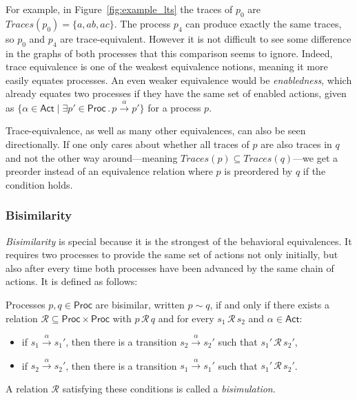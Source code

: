 For example, in Figure~\ref{fig:example_lts} the traces of $p_0$ are
$Traces(p_0) = \{a, ab, ac\}$.
The process $p_4$ can produce exactly the same traces,
so $p_0$ and $p_4$ are trace-equivalent.
However it is not difficult to see some difference in the graphs of both
processes that this comparison seems to ignore.
Indeed, trace equivalence is one of the weakest equivalence notions,
meaning it more easily equates processes.
An even weaker equivalence would be \emph{enabledness},
which already equates two processes
if they have the same set of enabled actions,
given as
$\{\alpha \in \mathsf{Act} \mid
   \exists p' \in \mathsf{Proc}\,.\,p \xrightarrow{\alpha} p'\}$
for a process $p$.

Trace-equivalence, as well as many other equivalences,
can also be seen directionally.
If one only cares about whether all traces of $p$ are also traces in $q$ and
not the other way around---meaning $Traces(p) \subseteq Traces(q)$---we get a
preorder instead of an equivalence relation where $p$ is preordered by $q$
if the condition holds.


\subsubsection{Bisimilarity}

\emph{Bisimilarity} is special because it is the strongest of the behavioral
equivalences.
It requires two processes to provide the same set of actions not only initially,
but also after every time both processes have been advanced
by the same chain of actions.
It is defined as follows:

\begin{definition}\label{def:bisimulation}
    Processes $p, q \in \mathsf{Proc}$ are bisimilar, written $p \sim q$,
    if and only if there exists a relation
    $\mathcal{R} \subseteq \mathsf{Proc} \times \mathsf{Proc}$
    with $p\, \mathcal{R}\, q$ and for every $s_1\, \mathcal{R}\, s_2$ and
    $\alpha \in \mathsf{Act}$:
    \begin{itemize}
        \item if $s_1 \xrightarrow{\alpha} s_1'$, then there is a transition
            $s_2 \xrightarrow{\alpha} s_2'$ such that $s_1'\, \mathcal{R}\, s_2'$,
        \item if $s_2 \xrightarrow{\alpha} s_2'$, then there is a transition
            $s_1 \xrightarrow{\alpha} s_1'$ such that $s_1'\, \mathcal{R}\, s_2'$.
    \end{itemize}
    A relation $\mathcal{R}$ satisfying these conditions is called a
    \emph{bisimulation}.
\end{definition}


